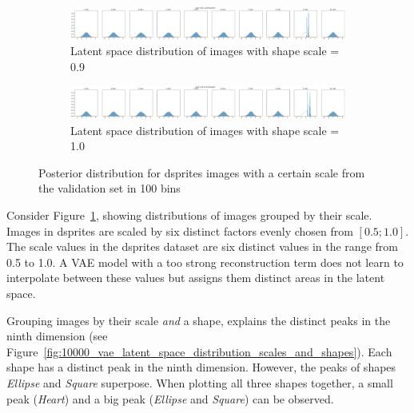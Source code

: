 \begin{figure}
\begin{subfigure}{\textwidth}
    \end{subfigure}
    \begin{subfigure}{\textwidth}
        \centering
        \includegraphics[width=\textwidth]{images/latent_space_entanglement/vae_dsprites_lf_10000_dist_scale_0_9.png}
        \caption{Latent space distribution of images with shape scale = 0.9}
    \end{subfigure}
    \begin{subfigure}{\textwidth}
        \centering
        \includegraphics[width=\textwidth]{images/latent_space_entanglement/vae_dsprites_lf_10000_dist_scale_1_0.png}
        \caption{Latent space distribution of images with shape scale = 1.0}
    \end{subfigure}
    \caption[VAE Latent Space Distribution - dsprites Scales]{Posterior distribution for dsprites images with a certain scale from the validation set in 100 bins}
    \label{fig:10000_vae_latent_space_distribution_scales}
\end{figure}

Consider Figure~\ref{fig:10000_vae_latent_space_distribution_scales}, showing distributions of images grouped by their scale.
Images in dsprites are scaled by six distinct factors evenly chosen from $[0.5; 1.0]$.
The scale values in the dsprites dataset are six distinct values in the range from 0.5 to 1.0.
A \ac{VAE} model with a too strong reconstruction term does not learn to interpolate between these values but assigns them distinct areas in the latent space.

Grouping images by their scale \textit{and} a shape, explains the distinct peaks in the ninth dimension (see Figure~\ref{fig:10000_vae_latent_space_distribution_scales_and_shapes}).
Each shape has a distinct peak in the ninth dimension.
However, the peaks of shapes \textit{Ellipse} and \textit{Square} superpose.
When plotting all three shapes together, a small peak (\textit{Heart}) and a big peak (\textit{Ellipse} and \textit{Square}) can be observed.

